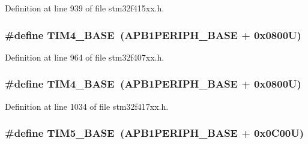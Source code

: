Definition at line 939 of file stm32f415xx.\+h.

\subsubsection[{\texorpdfstring{T\+I\+M4\+\_\+\+B\+A\+SE}{TIM4_BASE}}]{\setlength{\rightskip}{0pt plus 5cm}\#define T\+I\+M4\+\_\+\+B\+A\+SE~({\bf A\+P\+B1\+P\+E\+R\+I\+P\+H\+\_\+\+B\+A\+SE} + 0x0800\+U)}\hypertarget{group___peripheral__registers__structures_ga56e2d44b0002f316527b8913866a370d}{}\label{group___peripheral__registers__structures_ga56e2d44b0002f316527b8913866a370d}


Definition at line 964 of file stm32f407xx.\+h.

\subsubsection[{\texorpdfstring{T\+I\+M4\+\_\+\+B\+A\+SE}{TIM4_BASE}}]{\setlength{\rightskip}{0pt plus 5cm}\#define T\+I\+M4\+\_\+\+B\+A\+SE~({\bf A\+P\+B1\+P\+E\+R\+I\+P\+H\+\_\+\+B\+A\+SE} + 0x0800\+U)}\hypertarget{group___peripheral__registers__structures_ga56e2d44b0002f316527b8913866a370d}{}\label{group___peripheral__registers__structures_ga56e2d44b0002f316527b8913866a370d}


Definition at line 1034 of file stm32f417xx.\+h.

\subsubsection[{\texorpdfstring{T\+I\+M5\+\_\+\+B\+A\+SE}{TIM5_BASE}}]{\setlength{\rightskip}{0pt plus 5cm}\#define T\+I\+M5\+\_\+\+B\+A\+SE~({\bf A\+P\+B1\+P\+E\+R\+I\+P\+H\+\_\+\+B\+A\+SE} + 0x0\+C00\+U)}\hypertarget{group___peripheral__registers__structures_ga3e1671477190d065ba7c944558336d7e}{}\label{group___peripheral__registers__structures_ga3e1671477190d065ba7c944558336d7e}


